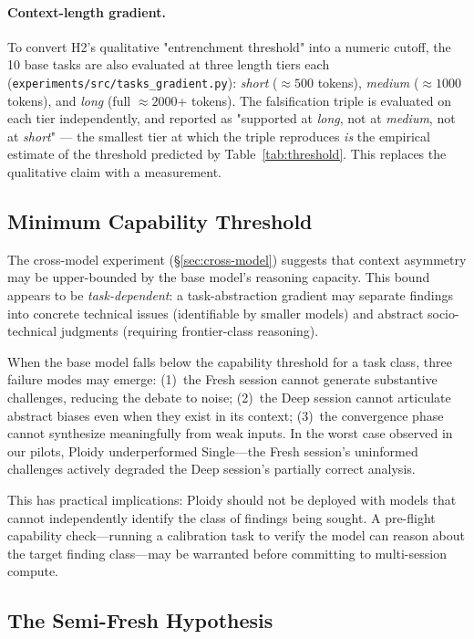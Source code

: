 \documentclass[11pt]{article}
\begin{document}
\paragraph{Context-length gradient.} To convert H2's qualitative "entrenchment threshold" into a numeric cutoff, the 10 base tasks are also evaluated at three length tiers each (\texttt{experiments/src/tasks\_gradient.py}): \emph{short} ($\approx 500$ tokens), \emph{medium} ($\approx 1000$ tokens), and \emph{long} (full $\approx 2000$+ tokens). The falsification triple is evaluated on each tier independently, and reported as "supported at \emph{long}, not at \emph{medium}, not at \emph{short}" --- the smallest tier at which the triple reproduces \emph{is} the empirical estimate of the threshold predicted by Table~\ref{tab:threshold}. This replaces the qualitative claim with a measurement.

\subsection{Minimum Capability Threshold}
\label{sec:capability-threshold}

The cross-model experiment (\S\ref{sec:cross-model}) suggests that context asymmetry may be upper-bounded by the base model's reasoning capacity. This bound appears to be \emph{task-dependent}: a task-abstraction gradient may separate findings into concrete technical issues (identifiable by smaller models) and abstract socio-technical judgments (requiring frontier-class reasoning).

When the base model falls below the capability threshold for a task class, three failure modes may emerge: (1)~the Fresh session cannot generate substantive challenges, reducing the debate to noise; (2)~the Deep session cannot articulate abstract biases even when they exist in its context; (3)~the convergence phase cannot synthesize meaningfully from weak inputs. In the worst case observed in our pilots, Ploidy underperformed Single---the Fresh session's uninformed challenges actively degraded the Deep session's partially correct analysis.

This has practical implications: Ploidy should not be deployed with models that cannot independently identify the class of findings being sought. A pre-flight capability check---running a calibration task to verify the model can reason about the target finding class---may be warranted before committing to multi-session compute.

\subsection{The Semi-Fresh Hypothesis}
\label{sec:semifresh}
\end{document}
